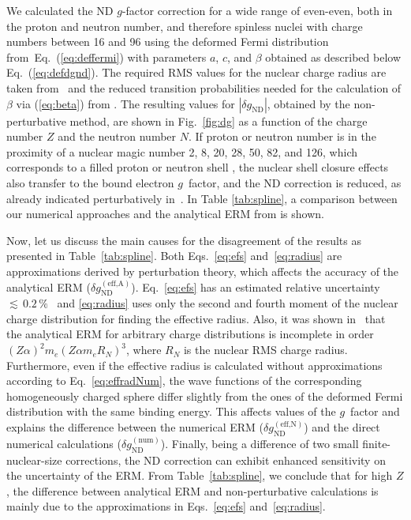 We calculated the ND $g$-factor correction for a wide range of even-even, both in the proton and neutron number, and therefore spinless nuclei with charge numbers between 16 and 96 using the deformed Fermi distribution from~Eq.~(\ref{eq:deffermi}) with parameters $a$, $c$, and $\beta$ obtained as described below Eq.~(\ref{eq:defdgnd}). The required RMS values for the nuclear charge radius are taken from~\cite{Angeli2013} and the reduced transition probabilities needed for the calculation of $\beta$ via (\ref{eq:beta}) from \cite{ENSDF}. The resulting values for $|\delta g_{\text{ND}}|$, obtained by the non-perturbative method, are shown in Fig.~\ref{fig:dg} as a function of the charge number $Z$ and the neutron number $N$. If proton or neutron number is in the proximity of a nuclear magic number 2, 8, 20, 28, 50, 82, and 126, which corresponds to a filled proton or neutron shell \cite{Ring}, the nuclear shell closure effects also transfer to the bound electron $g$~factor, and the ND correction is reduced, as already indicated perturbatively in~\cite{michel2015}. In Table \ref{tab:spline}, a comparison between our numerical approaches and the analytical ERM from \cite{jacek2012} is shown.

Now, let us discuss the main causes for the disagreement of the results as presented in Table~\ref{tab:spline}. Both Eqs.~\eqref{eq:efs} and~\eqref{eq:radius} are approximations derived by perturbation theory, which affects the accuracy of the analytical ERM ($\delta g_{\text{ND}}^{(\text{eff,A})}$). Eq.~\eqref{eq:efs} has an estimated relative uncertainty ${\scriptstyle\lesssim}\,0.2\,\%$~\cite{Shabaev1993} and \eqref{eq:radius} uses only the second and fourth moment of the nuclear charge distribution for finding the effective radius. Also, it was shown in~\cite{karshenboim2018} that the analytical ERM for arbitrary charge distributions is incomplete in order $(Z\alpha)^2m_e(Z\alpha m_e R_N)^3$, where $R_N$ is the nuclear RMS charge radius. Furthermore, even if the effective radius is calculated without approximations according to Eq.~\eqref{eq:effradNum}, the wave functions of the corresponding homogeneously charged sphere differ slightly from the ones of the deformed Fermi distribution with the same binding energy. This affects values of the $g$~factor and explains the difference between the numerical ERM ($\delta g_{\text{ND}}^{(\text{eff,N})}$) and the direct numerical calculations ($\delta g_{\text{ND}}^{(\text{num})}$). 
Finally, being a difference of two small finite-nuclear-size corrections, the ND correction can exhibit enhanced sensitivity on the uncertainty of the ERM.
From Table~\ref{tab:spline}, we conclude that for high $Z$, the difference between analytical ERM and non-perturbative calculations is mainly due to the approximations in Eqs.~\eqref{eq:efs} and~\eqref{eq:radius}.

